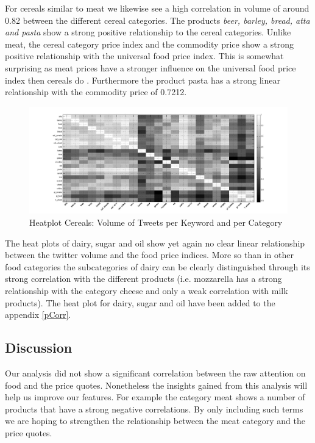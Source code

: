 For cereals similar to meat we likewise see a high correlation in volume of around 0.82 between the different cereal categories. The products \emph{beer, barley, bread, atta and pasta} show a strong positive relationship to the cereal categories. Unlike meat, the cereal category price index and the commodity price show a strong positive relationship with the universal food price index. This is somewhat surprising as meat prices have a stronger influence on the universal food price index then cereals do \cite{fao2008}. Furthermore the product pasta has a strong linear relationship with the commodity price of 0.7212.
\begin{figure}[H]
        \centering
         \includegraphics[width=1\textwidth ]{img/anal/black_cereals}
              
        \caption{Heatplot Cereals: Volume of Tweets per Keyword and per Category}
        \label{fig:distribution}
\end{figure}
 

The heat plots of dairy, sugar and oil show yet again no clear linear relationship between the twitter volume and the food price indices. More so than in other food categories the subcategories of dairy can be clearly distinguished through its strong correlation with the different products (i.e. mozzarella has a strong relationship with the category cheese and only a weak correlation with milk products). The heat plot for dairy, sugar and oil have been added to the appendix \ref{pCorr}.



\subsection{Discussion} 

Our analysis did not show a significant correlation between the raw attention on food and the price quotes.
Nonetheless the insights gained from this analysis will help us improve our features. For example the category meat shows a number of products that have a strong negative correlations. By only including such terms we are hoping to strengthen the relationship between the meat category and the price quotes.

